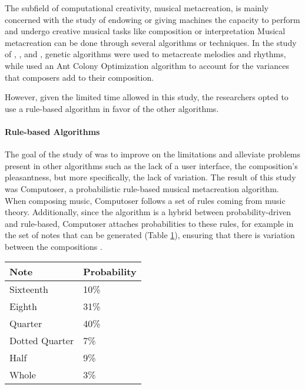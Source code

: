             The subfield of computational creativity, musical metacreation, is mainly concerned with the study of endowing or giving machines the capacity to perform and undergo creative musical tasks like composition or interpretation  Musical metacreation can be done through several algorithms or techniques. In the study of \citet{tokui2000music}, \citet{birchfield2003generative}, and \citet{kikuchi2014automatic}, genetic algorithms were used to metacreate melodies and rhythms, while \citet{geis2008creating} used an Ant Colony Optimization algorithm to account for the variances that composers add to their composition. 
            
            However, given the limited time allowed in this study, the researchers opted to use a rule-based algorithm in favor of the other algorithms.
        
        	\paragraph{Rule-based Algorithms}
            	
                The goal of the study of \citet{bozhanov2014computoser} was to improve on the limitations and alleviate problems present in other algorithms such as the lack of a user interface, the composition's pleasantness, but more specifically, the lack of variation. The result of this study was Computoser, a probabilistic rule-based musical metacreation algorithm. When composing music, Computoser follows a set of rules coming from music theory. Additionally, since the algorithm is a hybrid between probability-driven and rule-based, Computoser attaches probabilities to these rules, for example in the set of notes that can be generated (Table \ref{tab:cnp}), ensuring that there is variation between the compositions \citep{bozhanov2014computoser}. 


\begin{table} [!htbp]  
\centering
        \label{tab:cnp}
   \vspace{0.20cm}    
        \begin{tabular}{|p{4cm}|p{2cm}|} %
        \hline 
       Note & Probability \\ \hline
       Sixteenth & 10\% \\ \hline
       Eighth & 31\% \\ \hline
       Quarter & 40\% \\ \hline
       Dotted Quarter & 7\% \\ \hline
       Half & 9\% \\ \hline
       Whole & 3\% \\ \hline
        \end{tabular}
\end{table}

